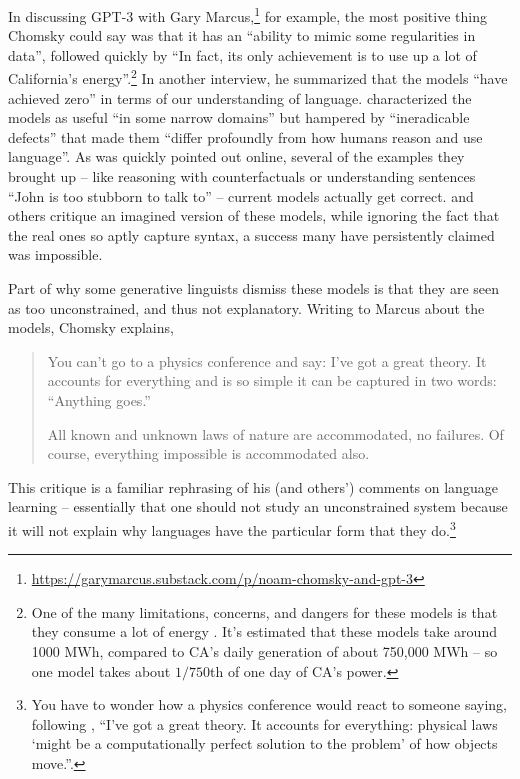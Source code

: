 \documentclass[output=paper,colorlinks,citecolor=brown]{langscibook}
\begin{document}
In discussing GPT-3 with Gary Marcus,\footnote{ \url{https://garymarcus.substack.com/p/noam-chomsky-and-gpt-3}} for example, the most positive thing Chomsky could say was that it has an ``ability to mimic some regularities in data'', followed quickly by ``In fact, its only achievement is to use up a lot of California’s energy''.\footnote{ One of the many limitations, concerns, and dangers \citep{bender2021dangers,bommasani2021opportunities} for these models is that they consume a lot of energy \citep{strubell2019energy}. It's estimated that these models take around 1000 MWh, compared to CA's daily generation of about 750,000 MWh -- so one model takes about $1/750$th of one day of CA's power.} In another interview, he summarized that the models ``have achieved zero'' in terms of our understanding of language. \citet{chomsky2023false} characterized the models as useful ``in some narrow domains'' but hampered by ``ineradicable defects'' that made them ``differ profoundly from how humans reason and use language''. As was quickly pointed out online, several of the examples they brought up -- like reasoning with counterfactuals or understanding sentences ``John is too stubborn to talk to'' -- current models actually get correct. \citet{chomsky2023false} and others critique an imagined version of these models, while ignoring the fact that the real ones so aptly capture syntax, a success many have persistently claimed was impossible.\largerpage

Part of why some generative linguists dismiss these models is that they are seen as too unconstrained, and thus not explanatory. Writing to Marcus about the models, Chomsky explains, 
\begin{quote}
You can’t go to a physics conference and say: I’ve got a great theory.  It accounts for everything and is so simple it can be captured in two words: ``Anything goes.''

All known and unknown laws of nature are accommodated, no failures.  Of course, everything impossible is accommodated also.
\end{quote}
This critique is a familiar rephrasing of his (and others') comments on language learning -- essentially that one should not study an unconstrained system because it will not explain why languages have the particular form that they do.\footnote{ You have to wonder how a physics conference would react to someone saying, following  \citet{lasnik2002minimalist}, ``I've got a great theory. It accounts for everything: physical laws `might be a computationally perfect solution to the problem' of how objects move.''.}
\end{document}
